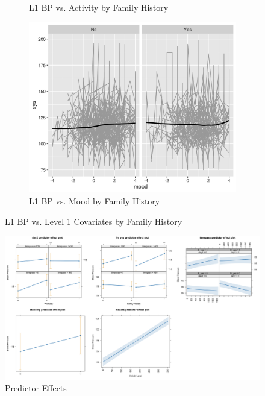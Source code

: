 \documentclass[12pt,twoside,letterpaper]{article}
\theoremstyle{definition}
\theoremstyle{definition}
\begin{document}
\begin{appendices}
\begin{figure}
\begin{subfigure}{0.32\textwidth}
            \caption{{\small L1 BP vs. Activity by Family History}}
            \label{fig: bp by act and fh}
        \end{subfigure}
        \hfill
        \begin{subfigure}{0.32\textwidth}
            \centering
            \includegraphics[width=\textwidth]{pics/bp v mood and fh facet.png}
            \caption{{\small L1 BP vs. Mood by Family History}}
            \label{fig: bp by mood and day}
        \end{subfigure}
        \caption{{\small L1 BP vs. Level 1 Covariates by Family History}}
        \label{fig: bp by level1 and fh}
    \end{figure}

    \begin{figure} 
    \centering
    \includegraphics[width=\textwidth]{pics/effects plot.png}
    \caption{Predictor Effects}
    \label{fig: effects}
    \end{figure}



\end{appendices}
\end{document}
